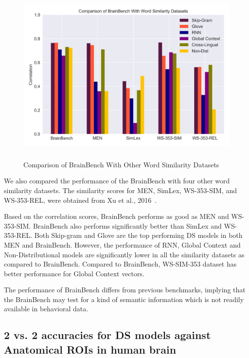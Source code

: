\begin{figure}[t]
\centering
\includegraphics[width=14cm, height=9cm]{Figures/Comparison}
\caption{Comparison of BrainBench With Other Word Similarity Datasets}
\label{wordsimcomparison}
\end{figure}

We also compared the performance of the BrainBench with four other word similarity datasets. The similarity scores for MEN, SimLex, WS-353-SIM, and WS-353-REL, were obtained from Xu et al., 2016~\cite{BrainBench2016}.

Based on the correlation scores, BrainBench performs as good as MEN and WS-353-SIM. BrainBench also performs significantly better than SimLex and WS-353-REL. Both Skip-gram and Glove are the top performing DS models in both MEN and BrainBench. However, the performance of RNN, Global Context and Non-Distributional models are significantly lower in all the similarity datasets as compared to BrainBench. Compared to BrainBench, WS-SIM-353 dataset has better performance for Global Context vectors. 

The performance of BrainBench differs from previous benchmarks, implying that the BrainBench may test for a kind of semantic information which is not readily available in behavioral data.

\subsection{2 vs. 2 accuracies for DS models against Anatomical ROIs in human brain}





